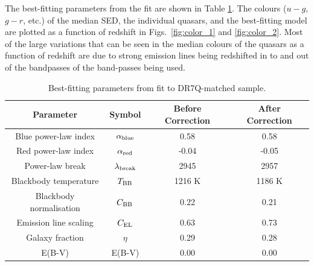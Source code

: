 The best-fitting parameters from the fit are shown in Table \ref{tab:params}. 
The colours ($u - g$, $g - r$, etc.) of the median SED, the individual quasars, and the best-fitting model are plotted as a function of redshift in Figs.~\ref{fig:color_1} and \ref{fig:color_2}.  
Most of the large variations that can be seen in the median colours of the quasars as a function of redshift are due to strong emission lines being redshifted in to and out of the bandpasses of the band-passes being used. 

\begin{table}
  \centering
  \begin{tabular}{c c c c}
    \hline 
    Parameter & Symbol & Before Correction & After Correction \\
    \hline 
    Blue power-law index & $\alpha_{\rm blue}$ & 0.58 & 0.58 \\
    Red power-law index & $\alpha_{\rm red}$ & -0.04 & -0.05 \\
    Power-law break & $\lambda_{\rm break}$ & 2945 & 2957 \\
    Blackbody temperature & $T_{\rm BB}$ & 1216 K & 1186 K \\
    Blackbody normalisation & $C_{\rm BB}$ & 0.22 & 0.21 \\
    Emission line scaling & $C_{\rm EL}$  & 0.63 &  0.73 \\
    Galaxy fraction & $\eta$ & 0.29 & 0.28 \\
    E(B-V) & E(B-V) & 0.00 & 0.00 \\
    \hline
  \end{tabular}
  \caption{Best-fitting parameters from fit to DR7Q-matched sample. }
  \label{tab:params}
\end{table}

